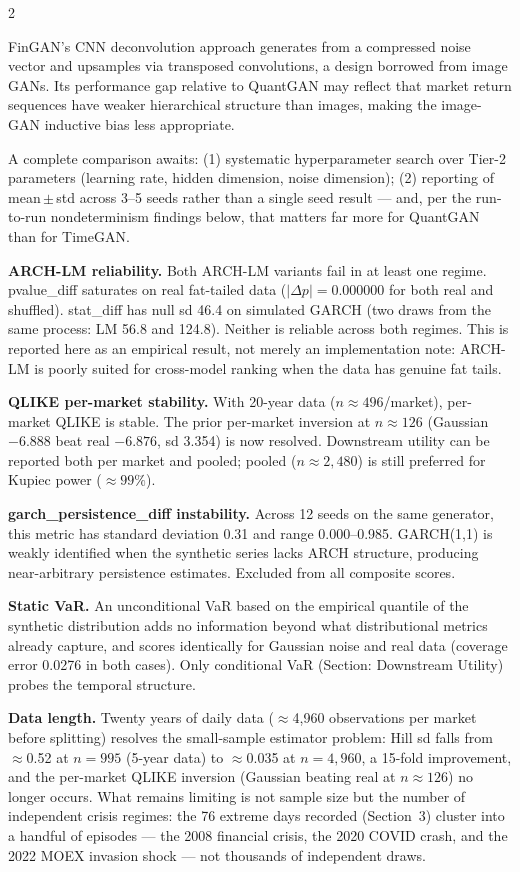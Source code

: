 \documentclass[10pt]{article}
\newcommand{\redbox}[2]{\begin{tcolorbox}[mybox={DRed}{RBg},title={#1}]#2\end{tcolorbox}}
\begin{document}
\begin{multicols}{2}
{FinGAN's CNN deconvolution approach generates from a compressed noise vector and upsamples via transposed convolutions, a design borrowed from image GANs. Its performance gap relative to QuantGAN may reflect that market return sequences have weaker hierarchical structure than images, making the image-GAN inductive bias less appropriate.

A complete comparison awaits: (1) systematic hyperparameter search over Tier-2 parameters (learning rate, hidden dimension, noise dimension); (2) reporting of mean\,$\pm$\,std across 3--5 seeds rather than a single seed result --- and, per the run-to-run nondeterminism findings below, that matters far more for QuantGAN than for TimeGAN.}

\columnbreak

\redbox{Known Failure Modes and Limitations}{%
\textbf{ARCH-LM reliability.} Both ARCH-LM variants fail in at least one regime. pvalue\_diff saturates on real fat-tailed data ($|\Delta p| = 0.000000$ for both real and shuffled). stat\_diff has null sd 46.4 on simulated GARCH (two draws from the same process: LM 56.8 and 124.8). Neither is reliable across both regimes. This is reported here as an empirical result, not merely an implementation note: ARCH-LM is poorly suited for cross-model ranking when the data has genuine fat tails.

\textbf{QLIKE per-market stability.} With 20-year data ($n\approx496$/market), per-market QLIKE is stable. The prior per-market inversion at $n\approx126$ (Gaussian $-6.888$ beat real $-6.876$, sd 3.354) is now resolved. Downstream utility can be reported both per market and pooled; pooled ($n\approx2{,}480$) is still preferred for Kupiec power ($\approx99\%$).

\textbf{garch\_persistence\_diff instability.} Across 12 seeds on the same generator, this metric has standard deviation 0.31 and range 0.000--0.985. GARCH(1,1) is weakly identified when the synthetic series lacks ARCH structure, producing near-arbitrary persistence estimates. Excluded from all composite scores.

\textbf{Static VaR.} An unconditional VaR based on the empirical quantile of the synthetic distribution adds no information beyond what distributional metrics already capture, and scores identically for Gaussian noise and real data (coverage error 0.0276 in both cases). Only conditional VaR (Section: Downstream Utility) probes the temporal structure.

\textbf{Data length.} Twenty years of daily data ($\approx$4{,}960 observations per market before splitting) resolves the small-sample estimator problem: Hill sd falls from $\approx$0.52 at $n=995$ (5-year data) to $\approx$0.035 at $n=4{,}960$, a 15-fold improvement, and the per-market QLIKE inversion (Gaussian beating real at $n\approx126$) no longer occurs. What remains limiting is not sample size but the number of independent crisis regimes: the 76 extreme days recorded (Section~3) cluster into a handful of episodes --- the 2008 financial crisis, the 2020 COVID crash, and the 2022 MOEX invasion shock --- not thousands of independent draws.}


\end{multicols}
\end{document}
